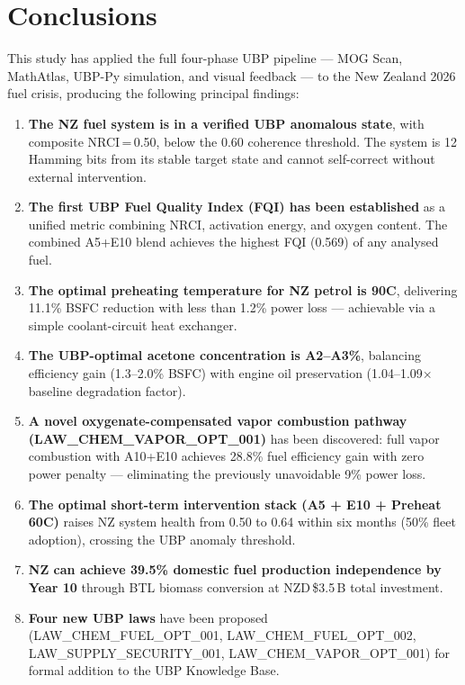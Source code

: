 \documentclass[12pt,a4paper]{article}
\begin{document}
\newpage

\section{Conclusions}

This study has applied the full four-phase UBP pipeline --- MOG Scan, MathAtlas,
UBP-Py simulation, and visual feedback --- to the New Zealand 2026 fuel crisis,
producing the following principal findings:

\begin{enumerate}
  \item \textbf{The NZ fuel system is in a verified UBP anomalous state}, with
  composite NRCI\,=\,0.50, below the 0.60 coherence threshold. The system is 12
  Hamming bits from its stable target state and cannot self-correct without
  external intervention.

  \item \textbf{The first UBP Fuel Quality Index (FQI) has been established} as a
  unified metric combining NRCI, activation energy, and oxygen content. The combined
  A5+E10 blend achieves the highest FQI (0.569) of any analysed fuel.

  \item \textbf{The optimal preheating temperature for NZ petrol is 90\textdegree C},
  delivering 11.1\% BSFC reduction with less than 1.2\% power loss --- achievable
  via a simple coolant-circuit heat exchanger.

  \item \textbf{The UBP-optimal acetone concentration is A2--A3\%}, balancing
  efficiency gain (1.3--2.0\% BSFC) with engine oil preservation (1.04--1.09$\times$
  baseline degradation factor).

  \item \textbf{A novel oxygenate-compensated vapor combustion pathway
  (LAW\_CHEM\_VAPOR\_OPT\_001)} has been discovered: full vapor combustion with
  A10+E10 achieves 28.8\% fuel efficiency gain with zero power penalty ---
  eliminating the previously unavoidable 9\% power loss.

  \item \textbf{The optimal short-term intervention stack (A5 + E10 + Preheat
  60\textdegree C)} raises NZ system health from 0.50 to 0.64 within six months
  (50\% fleet adoption), crossing the UBP anomaly threshold.

  \item \textbf{NZ can achieve 39.5\% domestic fuel production independence by
  Year 10} through BTL biomass conversion at NZD\,\$3.5\,B total investment.

  \item \textbf{Four new UBP laws} have been proposed (LAW\_CHEM\_FUEL\_OPT\_001,
  LAW\_CHEM\_FUEL\_OPT\_002, LAW\_SUPPLY\_SECURITY\_001, LAW\_CHEM\_VAPOR\_OPT\_001)
  for formal addition to the UBP Knowledge Base.
\end{enumerate}
\end{document}
